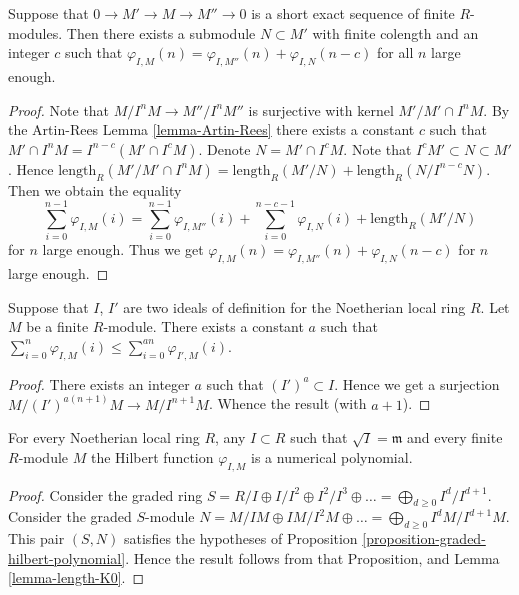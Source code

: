 \begin{lemma}
\label{lemma-hilbert-ses}
Suppose that $0 \to M' \to M \to M'' \to 0$
is a short exact sequence of finite $R$-modules.
Then there exists a submodule $N \subset M'$ with
finite colength and an integer $c$ such that $\varphi_{I, M}(n)
= \varphi_{I, M''}(n) + \varphi_{I, N}(n-c)$ for all $n$ large enough.
\end{lemma}

\begin{proof}
Note that $M/I^nM \to M''/I^nM''$ is surjective
with kernel $M' / M' \cap I^nM$. By the Artin-Rees
Lemma \ref{lemma-Artin-Rees} there exists a
constant $c$ such that $M' \cap I^nM =
I^{n-c}(M' \cap I^cM)$. Denote $N = M' \cap I^cM$.
Note that $I^c M' \subset N \subset M'$.
Hence $\text{length}_R(M' / M' \cap I^nM)
= \text{length}_R(M'/N) + \text{length}_R(N/I^{n-c}N)$.
Then we obtain the equality
$$
\sum_{i = 0}^{n-1} \varphi_{I, M}(i)
=
\sum_{i = 0}^{n-1} \varphi_{I, M''}(i)
+
\sum_{i = 0}^{n-c-1} \varphi_{I, N}(i)
+
\text{length}_R(M'/N)
$$
for $n$ large enough. Thus we get $\varphi_{I, M}(n)
= \varphi_{I, M''}(n) + \varphi_{I, N}(n-c)$ for
$n$ large enough.
\end{proof}

\begin{lemma}
\label{lemma-hilbert-change-I}
Suppose that $I$, $I'$ are two ideals of definition
for the Noetherian local ring $R$. Let $M$ be a
finite $R$-module. There exists a constant $a$ such that
$
\sum_{i = 0}^n \varphi_{I, M}(i) \leq
\sum_{i = 0}^{an}\varphi_{I', M}(i)$.
\end{lemma}

\begin{proof}
There exists an integer $a$ such that $(I')^a \subset I$.
Hence we get a surjection $M/(I')^{a(n + 1)}M \to M/I^{n + 1}M$.
Whence the result (with $a + 1$).
\end{proof}

\begin{proposition}
\label{proposition-hilbert-function-polynomial}
For every Noetherian local ring $R$, any $I \subset R$
such that $\sqrt{I} = \mathfrak m$ and every
finite $R$-module $M$ the Hilbert function $\varphi_{I, M}$
is a numerical polynomial.
\end{proposition}

\begin{proof}
Consider the graded ring $S = R/I \oplus I/I^2 \oplus I^2/I^3 \oplus
\ldots = \bigoplus_{d \geq 0} I^d/I^{d + 1}$. Consider the graded
$S$-module $N = M/IM \oplus IM/I^2M \oplus \ldots =
\bigoplus_{d \geq 0} I^dM/I^{d + 1}M$. This pair $(S, N)$ satisfies
the hypotheses of Proposition \ref{proposition-graded-hilbert-polynomial}.
Hence the result follows from that Proposition, and
Lemma \ref{lemma-length-K0}.
\end{proof}

